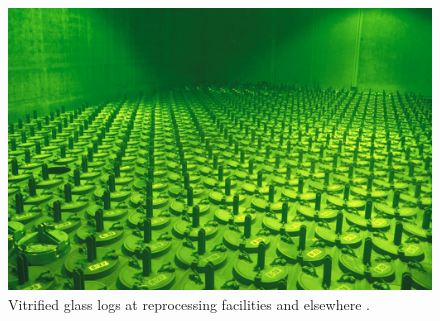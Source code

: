 \begin{figure}[htbp!]
\begin{center}
\begin{minipage}[t]{0.45\textwidth}
      \includegraphics[height=0.4\textheight]{./images/logs.eps}
        \caption{Vitrified glass logs at reprocessing facilities and elsewhere 
          \cite{essick_photographing_2012}.}
        \label{fig:logs}
    \end{minipage}
    \end{center}
  \end{figure}
